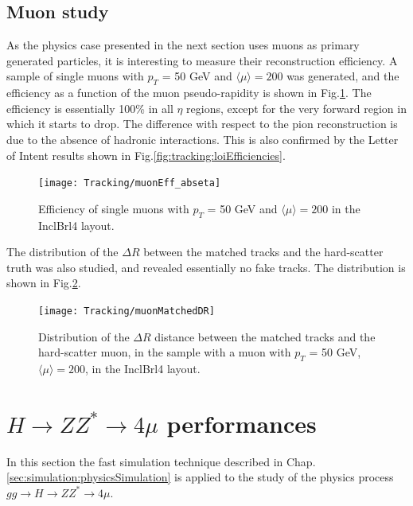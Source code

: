\documentclass[a4paper,twoside,12pt]{book}
\begin{document}
\section{Muon study}
As the physics case presented
in the next section uses muons as primary generated particles, it is interesting to measure their reconstruction efficiency. A sample of 
single muons with $p_{T}$ = 50 GeV and $\langle\mu\rangle = 200$ was generated, and the efficiency as a function of the muon pseudo-rapidity is
shown in \mbox{Fig.\ref{fig:tracking:muonEff_abseta}}. The efficiency is essentially 100\% in all $\eta$ regions, except for the very forward region in which it starts to drop.
The difference with respect to the pion reconstruction is due to the absence of hadronic interactions. This is also confirmed by the Letter of Intent\cite{loi} results shown in Fig.\ref{fig:tracking:loiEfficiencies}.\\

\begin{figure}
\centering
\texttt{[image: Tracking/muonEff\_abseta]}
\caption{Efficiency of single muons with $p_{T}$ = 50 GeV and $\langle\mu\rangle = 200$ in the InclBrl4 layout.}
\label{fig:tracking:muonEff_abseta}
\end{figure} 

The distribution of the $\Delta R$ between the matched tracks and the hard-scatter truth was also studied, and revealed essentially no fake tracks. The distribution is
shown in Fig.\ref{fig:tracking:muonMatchedDR}.\\

\begin{figure}
\centering
\texttt{[image: Tracking/muonMatchedDR]}
\caption{Distribution of the $\Delta R$ distance between the matched tracks and the hard-scatter muon, in the sample with a muon with $p_{T}$ = 50 GeV, $\langle\mu\rangle = 200$, in the InclBrl4 layout.}
\label{fig:tracking:muonMatchedDR}
\end{figure} 


\clearpage

\chapter{$H \rightarrow ZZ^* \rightarrow 4\mu$ performances}
In this section the fast simulation technique described in Chap.\ref{sec:simulation:physicsSimulation} is
applied to the study of the physics process $gg \rightarrow H \rightarrow ZZ^* \rightarrow 4\mu$. \\
\end{document}
